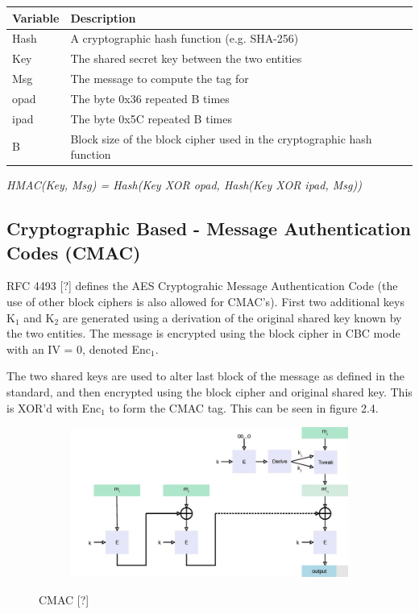\documentclass[bsc,frontabs,twoside,singlespacing,parskip,deptreport]{infthesis}     %
\begin{document}
\begin{table}[H]
\begin{tabular}{|l|l|}
\hline
Variable & Description\\
\hline
Hash & A cryptographic hash function (e.g. SHA-256)\\
\hline
Key & The shared secret key between the two entities\\
\hline
Msg & The message to compute the tag for\\
\hline
opad & The byte 0x36 repeated B times\\
\hline
ipad & The byte 0x5C repeated B times\\
\hline
B & Block size of the block cipher used in the cryptographic hash function\\
\hline
\end{tabular}
\end{table}

\begin{center}
\textit{HMAC(Key, Msg) = Hash(Key XOR opad, Hash(Key XOR ipad, Msg))}
\end{center}


\subsection{Cryptographic Based - Message Authentication Codes (CMAC)}

RFC 4493 [?] defines the AES Cryptograhic Message Authentication Code (the use of other block ciphers is also allowed for CMAC's). First two additional keys K$_1$ and K$_2$ are generated using a derivation of the original shared key known by the two entities. The message is encrypted using the block cipher in CBC mode with an IV = 0, denoted Enc$_1$. 

The two shared keys are used to alter last block of the message as defined in the standard, and then encrypted using the block cipher and original shared key. This is XOR'd with Enc$_1$ to form the CMAC tag. This can be seen in figure 2.4.


\begin{figure}[H]
\centering
\begin{subfigure}{1.2\textwidth}
  \includegraphics[width=1\linewidth]
  {images/crypto/CMAC.jpg}
\end{subfigure}
\caption{CMAC [?]}
\end{figure}
\end{document}
